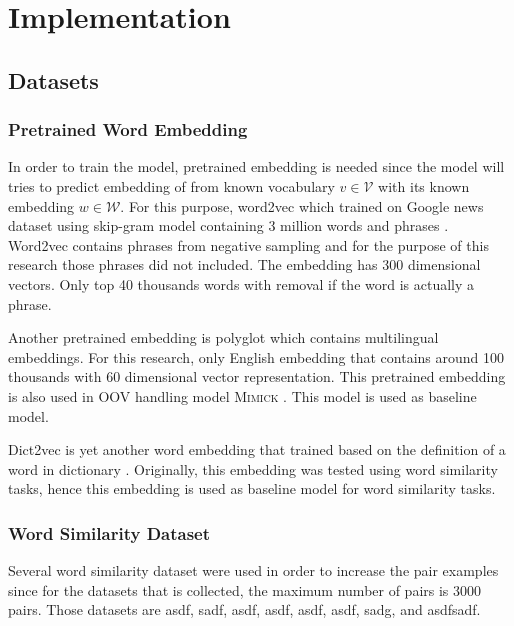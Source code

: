 \chapter{Implementation}
\label{chap:implementation}

\section{Datasets}
    \subsection{Pretrained Word Embedding}
        In order to train the model, pretrained embedding is needed
        since the model will tries to predict embedding of from known
        vocabulary $v \in \mathcal{V}$ with its known embedding $w \in
        \mathcal{W}$. For this purpose, word2vec which trained on
        Google news dataset using skip-gram model containing 3 million
        words and phrases \cite{Distributed2013mikolov}. Word2vec
        contains phrases from negative sampling and for the purpose of
        this research those phrases did not included. The embedding
        has 300 dimensional vectors. Only top 40 thousands words with
        removal if the word is actually a phrase.
        
        Another pretrained embedding is polyglot
        \cite{polyglot2013alrfou} which contains multilingual
        embeddings. For this research, only English embedding that
        contains around 100 thousands with 60 dimensional vector
        representation. This pretrained embedding is also used in OOV
        handling model \textsc{Mimick} \cite{mimicking2017Pinter}.
        This model is used as baseline model.

        Dict2vec is yet another word embedding that trained based on
        the definition of a word in dictionary
        \cite{dict2vect2017tissier}. Originally, this embedding was
        tested using word similarity tasks, hence this embedding is
        used as baseline model for word similarity tasks.

    \subsection{Word Similarity Dataset}
        Several word similarity dataset were used in order to increase
        the pair examples since for the datasets that is collected,
        the maximum number of pairs is 3000 pairs. Those datasets are
        asdf, sadf, asdf, asdf, asdf, asdf, sadg, and asdfsadf.


